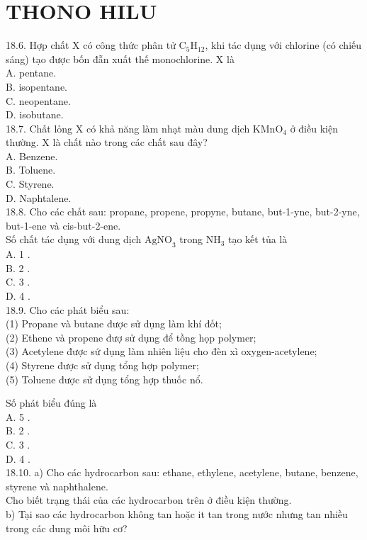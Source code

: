 \documentclass[10pt]{article}
\begin{document}
\section*{THONO HILU}
18.6. Hợp chất X có công thức phân tử $\mathrm{C}_{5} \mathrm{H}_{12}$, khi tác dụng với chlorine (có chiếu sáng) tạo được bốn đẫn xuất thế monochlorine. X là\\
A. pentane.\\
B. isopentane.\\
C. neopentane.\\
D. isobutane.\\
18.7. Chất lỏng X có khả năng làm nhạt màu dung dịch $\mathrm{KMnO}_{4}$ ở điều kiện thường. X là chất nào trong các chất sau đây?\\
A. Benzene.\\
B. Toluene.\\
C. Styrene.\\
D. Naphtalene.\\
18.8. Cho các chất sau: propane, propene, propyne, butane, but-1-yne, but-2-yne, but-1-ene và cis-but-2-ene.\\
Số chất tác dụng với dung dịch $\mathrm{AgNO}_{3}$ trong $\mathrm{NH}_{3}$ tạo kết tủa là\\
A. 1 .\\
B. 2 .\\
C. 3 .\\
D. 4 .\\
18.9. Cho các phát biểu sau:\\
(1) Propane và butane được sử dụng làm khí đốt;\\
(2) Ethene và propene đượ sử dụng để tồng họp polymer;\\
(3) Acetylene được sứ dụng làm nhiên liệu cho đèn xì oxygen-acetylene;\\
(4) Styrene được sử dụng tổng hợp polymer;\\
(5) Toluene được sử dụng tổng hợp thuốc nổ.

Số phát biểu đúng là\\
A. 5 .\\
B. 2 .\\
C. 3 .\\
D. 4 .\\
18.10. a) Cho các hydrocarbon sau: ethane, ethylene, acetylene, butane, benzene, styrene và naphthalene.\\
Cho biết trạng thái của các hydrocarbon trên ở điều kiện thường.\\
b) Tại sao các hydrocarbon không tan hoặc it tan trong nước nhưng tan nhiều trong các dung môi hữu cơ?
\end{document}

